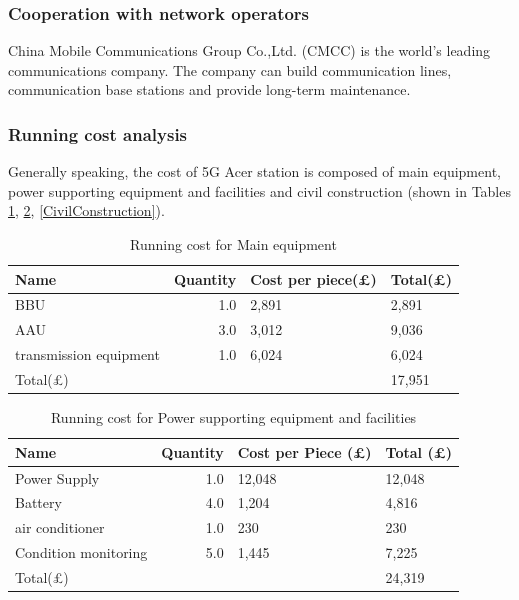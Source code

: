 \documentclass[11pt]{article}
\numberwithin{equation}{section}
\begin{document}
\subsubsection{Cooperation with network operators}
\label{sec:org9010d5c}
China Mobile Communications Group Co.,Ltd. (CMCC) is the world's leading communications company. The company can build communication lines, communication base stations and provide long-term maintenance.

\subsubsection{Running cost analysis}
\label{sec:org792177e}
Generally speaking, the cost of 5G Acer station is composed of main equipment, power supporting equipment and facilities and civil construction (shown in Tables \ref{MainEquipment}, \ref{PowerSupportingEquipmentAndFacilities}, \ref{CivilConstruction}).

\begin{table}[H]
\caption{\label{MainEquipment}Running cost for Main equipment}
\centering
\begin{tabular}{lrll}
\toprule
Name & Quantity & Cost per piece(\pounds) & Total(\pounds)\\
\midrule
BBU & 1.0 & 2,891 & 2,891\\
AAU & 3.0 & 3,012 & 9,036\\
transmission equipment & 1.0 & 6,024 & 6,024\\
\midrule
Total(\pounds) &  &  & 17,951\\
\bottomrule
\end{tabular}
\end{table}

\begin{table}[H]
\caption{\label{PowerSupportingEquipmentAndFacilities}Running cost for Power supporting equipment and facilities}
\centering
\begin{tabular}{lrll}
\toprule
Name & Quantity & Cost per Piece (\pounds) & Total (\pounds)\\
\midrule
Power Supply & 1.0 & 12,048 & 12,048\\
Battery & 4.0 & 1,204 & 4,816\\
air conditioner & 1.0 & 230 & 230\\
Condition monitoring & 5.0 & 1,445 & 7,225\\
\midrule
Total(\pounds) &  &  & 24,319\\
\bottomrule
\end{tabular}
\end{table}
\end{document}
